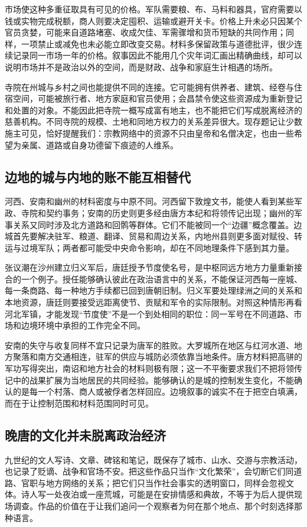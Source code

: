 市场使这种多重征取具有可见的价格。军队需要粮、布、马料和器具，官府需要以钱或实物完成税额，商人则要决定囤积、运输或避开关卡。价格上升未必只因某个官员贪婪，可能来自道路堵塞、收成欠佳、军需骤增和货币短缺的共同作用；同样，一项禁止或减免也未必能立即改变交易。材料多保留政策与道德批评，很少连续记录同一市场一年的价格。叙事因此不能用几个灾年词汇画出精确曲线，却可以说明市场并不是政治以外的空间，而是财政、战争和家庭生计相遇的场所。

寺院在州城与乡村之间也能提供不同的连接。它可能拥有供养者、建筑、经卷与住宿空间，可能被旅行者、地方家庭和官员使用；会昌禁令使这些资源成为重新登记和处置的对象。不能因此把寺院一概写成富有地主，也不能把它们写成脱离经济的慈善机构。不同寺院的规模、土地和同地方权力的关系差异很大。现存题记让少数施主可见，恰好提醒我们：宗教网络中的资源不只由皇帝和名僧决定，也由一些希望为亲属、道路或自身功德留下痕迹的人维系。

\subsection{边地的城与内地的账不能互相替代}
河西、安南和幽州的材料密度与中原不同。河西留下敦煌文书，能使人看到某些军政、寺院和契约事务；安南的历史则更多经由唐方本纪和将领传记出现；幽州的军事关系又同时涉及北方道路和回鹘等群体。它们不能被同一个“边疆”概念覆盖。边城首先要解决驻军、粮道、翻译、贸易和周边关系，内地州县则更多面对赋役、转运与过境军队；两者都可能受中央命令影响，却在不同地理条件下感到其力量。

张议潮在沙州建立归义军后，唐廷授予节度使名号，是中枢同远方地方力量重新接合的一个例子。授任能够确认彼此在政治语言中的关系，不能保证河西每一座城、每一条商路、每一种地方手续都已回到唐朝旧制。归义军要处理绿洲之间的关系和本地资源，唐廷则要接受远距离使节、贡赋和军令的实际限制。对照这种情形再看河北军镇，才能发现“节度使”不是一个到处相同的职位：同一军号在不同道路、市场和边境环境中承担的工作完全不同。

安南的失守与收复同样不宜只记录为唐军的胜败。大罗城所在地区与红河水道、地方聚落和南方交通相连，驻军的供应与城防必须依靠当地条件。唐方材料把高骈的军功写得突出，南诏和地方社会的材料则极有限；这一不平衡要求我们不把将领传记中的战果扩展为当地居民的共同经验。能够确认的是城的控制发生变化，不能确认的是每一个村落、商人或被俘者怎样回应。边境叙事的诚实不在于把空白填满，而在于让控制范围和材料范围同时可见。

\subsection{晚唐的文化并未脱离政治经济}
九世纪的文人写诗、文章、碑铭和笔记，既保存了城市、山水、交游与宗教活动，也记录了贬谪、战争和官场不安。把这些作品只当作“文化繁荣”，会切断它们同道路、官职与地方网络的关系；把它们只当作社会事实的透明窗口，同样会忽视文体。诗人写一处夜泊或一座荒城，可能是在安排情感和典故，不等于为后人提供现场调查。作品的价值在于让我们追问一个观察者为何在那个地点、那个时刻选择那种语言。

